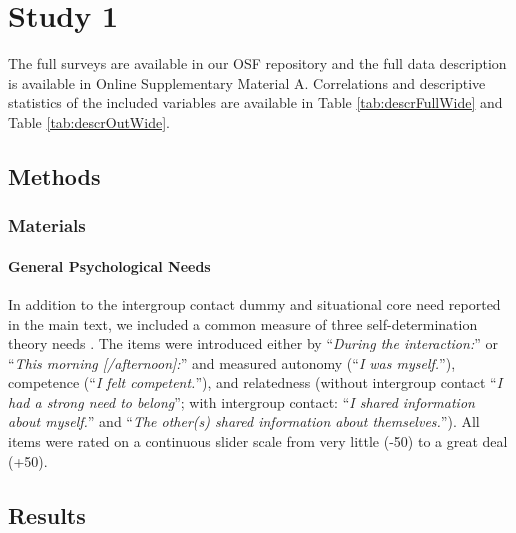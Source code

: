 \section{Study 1}

The full surveys are available in our OSF repository
\citep{KreienkampMasked2022a} and the full data description is available
in Online Supplementary Material A. Correlations and descriptive
statistics of the included variables are available in Table
\ref{tab:descrFullWide} and Table \ref{tab:descrOutWide}.

\subsection{Methods}

\subsubsection{Materials}

\paragraph{General Psychological Needs}

In addition to the intergroup contact dummy and situational core need
reported in the main text, we included a common measure of three
self-determination theory needs \citep[see][]{Downie2008}. The items
were introduced either by ``\textit{During the interaction:}'' or
``\textit{This morning [/afternoon]:}'' and measured autonomy
(``\textit{I was myself.}''), competence
(``\textit{I felt competent.}''), and relatedness (without intergroup
contact ``\textit{I had a strong need to belong}''; with intergroup
contact: ``\textit{I shared information about myself.}'' and
``\textit{The other(s) shared information about themselves.}''). All
items were rated on a continuous slider scale from very little (-50) to
a great deal (+50).

\subsection{Results}

